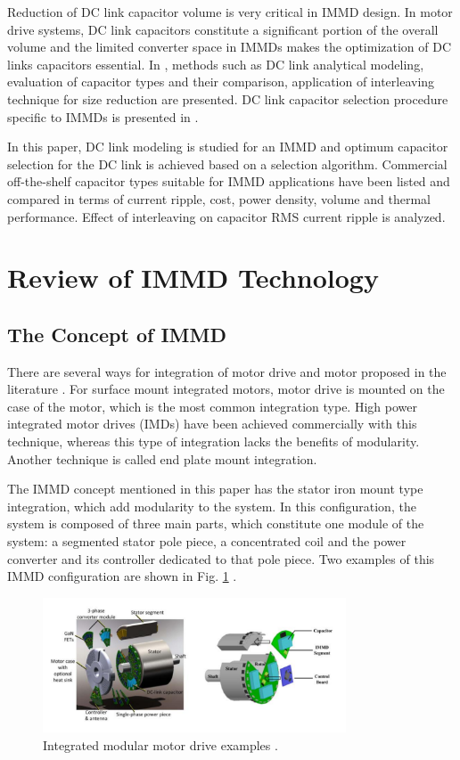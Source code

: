 \documentclass[conference,a4paper,twocolumn]{IEEEtran}
\begin{document}
Reduction of DC link capacitor volume is very critical in IMMD design. In motor drive systems, DC link capacitors constitute a significant portion of the overall volume and the limited converter space in IMMDs makes the optimization of DC links capacitors essential. In \cite{Su2010,Bianchi2003,Zhang2010}, methods such as DC link analytical modeling, evaluation of capacitor types and their comparison, application of interleaving technique for size reduction are presented. DC link capacitor selection procedure specific to IMMDs is presented in \cite{LoCalzo2016,Wang2014,Wang2015b}.

In this paper, DC link modeling is studied for an IMMD and optimum capacitor selection for the DC link is achieved based on a selection algorithm. Commercial off-the-shelf capacitor types suitable for IMMD applications have been listed and compared in terms of current ripple, cost, power density, volume and thermal performance. Effect of interleaving on capacitor RMS current ripple is analyzed.


\section{Review of IMMD Technology}

\subsection{The Concept of IMMD}

There are several ways for integration of motor drive and motor proposed in the literature \cite{LoCalzo2016,Wolmarans2008}. For surface mount integrated motors, motor drive is mounted on the case of the motor, which is the most common integration type. High power integrated motor drives (IMDs) have been achieved commercially with this technique, whereas this type of integration lacks the benefits of modularity. Another technique is called end plate mount integration.

The IMMD concept mentioned in this paper has the stator iron mount type integration, which add modularity to the system. In this configuration, the system is composed of three main parts, which constitute one module of the system: a segmented stator pole piece, a concentrated coil and the power converter and its controller dedicated to that pole piece. Two examples of this IMMD configuration are shown in Fig. \ref{fig1} \cite{LoCalzo2016,Wang2015b}.


\begin{figure}[h]
  \centering
  \includegraphics[width=9cm]{fig1}
  \caption{Integrated modular motor drive examples \cite{LoCalzo2016,Wang2015b}.}
  \label{fig1}
\end{figure}
\end{document}
